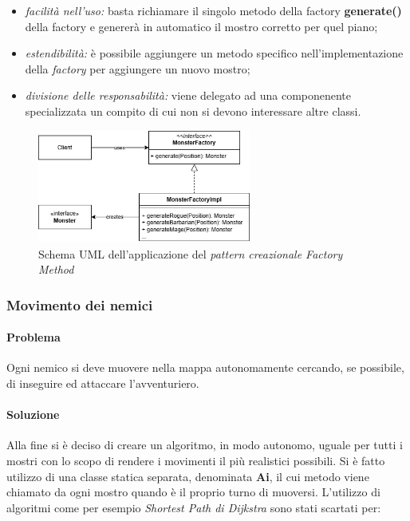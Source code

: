 \documentclass{report}
\begin{document}
\begin{itemize}
    \item \textit{facilità nell'uso:} basta richiamare il singolo metodo della factory \textbf{generate()} della factory e genererà in automatico il mostro corretto per quel piano;
    \item \textit{estendibilità:} è possibile aggiungere un metodo specifico nell'implementazione della \textit{factory} per aggiungere un nuovo mostro;
    \item \textit{divisione delle responsabilità:} viene delegato ad una componenente specializzata un compito di cui non si devono interessare altre classi.
\end{itemize}

\begin{figure}[H]
    \centering
    \includegraphics[width=7cm]{FactoryMethod.png}
    \caption{Schema UML dell'applicazione del \textit{pattern creazionale Factory Method}}
\end{figure}

\subsubsection{Movimento dei nemici}

\paragraph{Problema} Ogni nemico si deve muovere nella mappa autonomamente cercando, se possibile, di inseguire ed attaccare l'avventuriero.

\paragraph{Soluzione} Alla fine si è deciso di creare un algoritmo, in modo autonomo, uguale per tutti i mostri con lo scopo di rendere i movimenti il più realistici possibili. Si è fatto 
%
utilizzo di una classe statica separata, denominata \textbf{Ai}, il cui metodo viene chiamato da ogni mostro quando è il proprio turno di muoversi. L'utilizzo di algoritmi come per esempio
%
\textit{Shortest Path di Dijkstra} sono stati scartati per:
\end{document}
